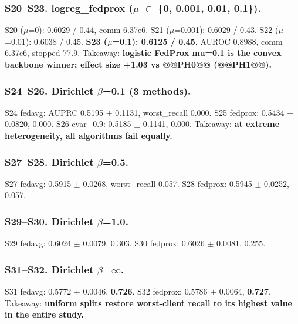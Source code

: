 \documentclass{article}
\begin{document}
\subsubsection{S20--S23. logreg\_fedprox (\ensuremath{\mu} \ensuremath{\in} \{0, 0.001, 0.01, 0.1\}).}

S20 (\ensuremath{\mu}=0): 0.6029 / 0.44, comm 6.37e6. S21 (\ensuremath{\mu}=0.001): 0.6029 / 0.43. S22 (\ensuremath{\mu}=0.01): 0.6038 / 0.45. \textbf{S23 (\ensuremath{\mu}=0.1): 0.6125 / 0.45}, AUROC 0.8988, comm 6.37e6, stopped 77.9. Takeaway: \textbf{logistic FedProx mu=0.1 is the convex backbone winner; effect size +1.03 vs @@PH0@@ (@@PH1@@).}


\subsubsection{S24--S26. Dirichlet \ensuremath{\beta}=0.1 (3 methods).}

S24 fedavg: AUPRC 0.5195 \ensuremath{\pm} 0.1131, worst\_recall 0.000. S25 fedprox: 0.5434 \ensuremath{\pm} 0.0820, 0.000. S26 cvar\_0.9: 0.5185 \ensuremath{\pm} 0.1141, 0.000. Takeaway: \textbf{at extreme heterogeneity, all algorithms fail equally.}


\subsubsection{S27--S28. Dirichlet \ensuremath{\beta}=0.5.}

S27 fedavg: 0.5915 \ensuremath{\pm} 0.0268, worst\_recall 0.057. S28 fedprox: 0.5945 \ensuremath{\pm} 0.0252, 0.057.


\subsubsection{S29--S30. Dirichlet \ensuremath{\beta}=1.0.}

S29 fedavg: 0.6024 \ensuremath{\pm} 0.0079, 0.303. S30 fedprox: 0.6026 \ensuremath{\pm} 0.0081, 0.255.


\subsubsection{S31--S32. Dirichlet \ensuremath{\beta}=\ensuremath{\infty}.}

S31 fedavg: 0.5772 \ensuremath{\pm} 0.0046, \textbf{0.726}. S32 fedprox: 0.5786 \ensuremath{\pm} 0.0064, \textbf{0.727}. Takeaway: \textbf{uniform splits restore worst-client recall to its highest value in the entire study.}
\end{document}
